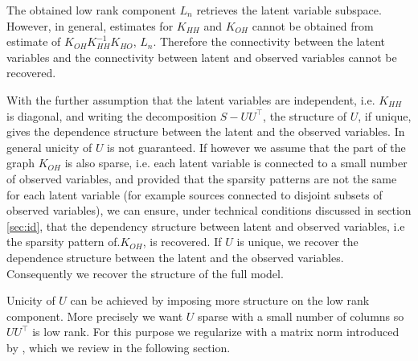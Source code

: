 
The obtained low rank component $L_{n}$ retrieves the latent variable subspace. However, in general, estimates for $K_{HH}$ and  $K_{OH}$ cannot be obtained from estimate of $K_{OH}K_{HH}^{-1}K_{HO}$,         $L_{n}$. Therefore the connectivity between the latent variables and the connectivity between latent and observed variables cannot be recovered. 



With the further assumption that the latent variables are independent,  i.e. $K_{HH}$ is  diagonal,  and writing the decomposition $S-UU^{\top}$, the structure of $U$, if unique,   gives the dependence structure  between the latent and the observed variables. In general unicity of $U$ is not guaranteed. If however we assume that the part of the graph $K_{OH}$ is also sparse, i.e. each latent variable is connected to a small number of observed variables, and provided that the sparsity patterns are not the same for each latent variable (for example sources connected to disjoint subsets of observed variables), we can ensure, under technical conditions discussed in section \ref{sec:id}, that the dependency structure between latent and observed variables, i.e the sparsity pattern of.$K_{OH}$, is recovered. If $U$ is unique, we recover the dependence structure  between the latent and the observed variables. Consequently we recover the structure of the full model.




Unicity of $U$ can be achieved by imposing more structure on the low rank component. More precisely we want $U$ sparse with a small number of columns so $UU^{\top}$ is low rank. For this purpose we regularize with a matrix norm  introduced by \citet{richard2014tight}, which we review in the following
section.

